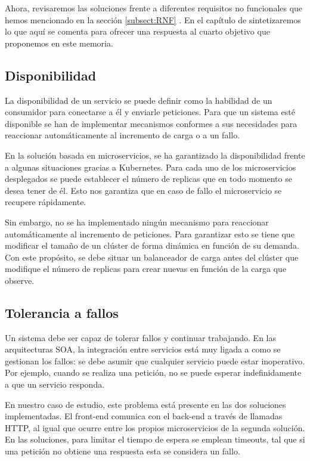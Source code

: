 \documentclass[11pt,spanish,listoffigures]{tfgetsinf}
\begin{document}
Ahora, revisaremos las soluciones frente a diferentes requisitos no funcionales que hemos mencionado en la sección \ref{subsect:RNF} . En el capítulo de  sintetizaremos lo que aquí se comenta para ofrecer una respuesta al cuarto objetivo que proponemos en este memoria.

\subsection{Disponibilidad}

La disponibilidad de un servicio se puede definir como la habilidad de un consumidor para conectarse a él y enviarle peticiones. \cite{Richards2016} Para que un sistema esté disponible se han de implementar mecanismos conformes a sus necesidades para reaccionar automáticamente al incremento de carga o a un fallo. \cite{Newman2015a}

En la solución basada en microservicios, se ha garantizado la disponibilidad frente a algunas situaciones gracias a Kubernetes. Para cada uno de los microservicios desplegados se puede establecer el número de replicas que en todo momento se desea tener de él. Esto nos garantiza que en caso de fallo el microservicio se recupere rápidamente. 

Sin embargo, no se ha implementado ningún mecanismo para reaccionar automáticamente al incremento de peticiones. Para garantizar esto se tiene que modificar el tamaño de un clúster de forma dinámica en función de su demanda. Con este propósito, se debe situar un balanceador de carga antes del clúster que modifique el número de replicas para crear nuevas en función de la carga que observe. \cite{Rensin2015}

\subsection{Tolerancia a fallos}

Un sistema debe ser capaz de tolerar fallos y continuar trabajando. En las arquitecturas SOA, la integración entre servicios está muy ligada a como se gestionan los fallos: se debe asumir que cualquier servicio puede estar inoperativo. Por ejemplo, cuando se realiza una petición, no se puede esperar indefinidamente a que un servicio responda. \cite{Newman2015a}

En nuestro caso de estudio, este problema está presente en las dos soluciones implementadas. El front-end comunica con el back-end a través de llamadas HTTP, al igual que ocurre entre los propios microservicios de la segunda solución. En las soluciones, para limitar el tiempo de espera se emplean timeouts, tal que si una petición no obtiene una respuesta esta se considera un fallo.
\end{document}
